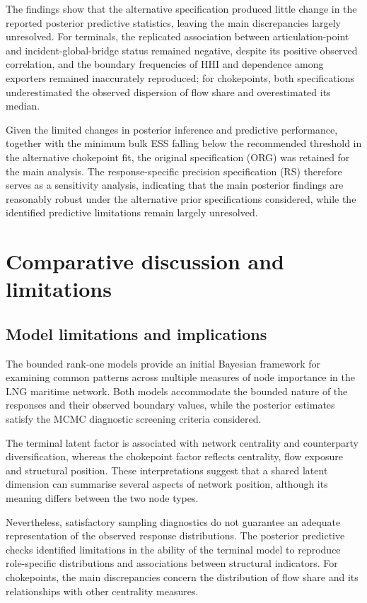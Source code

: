 \documentclass[pdftex,12pt,openright,a4paper,oneside]{book}
\begin{document}
The findings show that the alternative specification produced little
change in the reported posterior predictive
statistics, leaving the main discrepancies
largely unresolved. For terminals, the replicated association between
articulation-point and incident-global-bridge status
remained negative, despite its positive observed
correlation, and the boundary frequencies of HHI and
dependence among exporters remained
inaccurately reproduced; for chokepoints, both specifications underestimated
the observed dispersion of flow share and
overestimated its median.

Given the limited changes in posterior inference and predictive performance, together 
with the minimum bulk ESS falling below the recommended threshold in the 
alternative chokepoint fit, the original specification (ORG) was retained for the main analysis. 
The response-specific precision specification (RS) therefore serves as a sensitivity analysis, 
indicating that the main posterior findings are reasonably robust under the alternative 
prior specifications considered, while the identified predictive limitations remain largely unresolved.

\section{Comparative discussion and limitations}
\subsection{Model limitations and implications}
\label{sec:limitations}

The bounded rank-one models provide an initial Bayesian
framework for examining common patterns across multiple
measures of node importance in the LNG maritime network.
Both models accommodate the bounded nature of the responses
and their observed boundary values, while the
posterior estimates satisfy the MCMC diagnostic screening criteria considered.

The terminal latent factor is associated with network
centrality and counterparty diversification, whereas the
chokepoint factor reflects centrality, flow exposure and
structural position. These interpretations suggest that
a shared latent dimension can summarise several aspects
of network position, although its meaning differs
between the two node types.

Nevertheless, satisfactory sampling diagnostics do not
guarantee an adequate representation of the observed
response distributions. The posterior predictive checks
identified limitations in the ability of the terminal
model to reproduce role-specific distributions and
associations between structural indicators. For
chokepoints, the main discrepancies concern the
distribution of flow share and its relationships
with other centrality measures.
\end{document}
